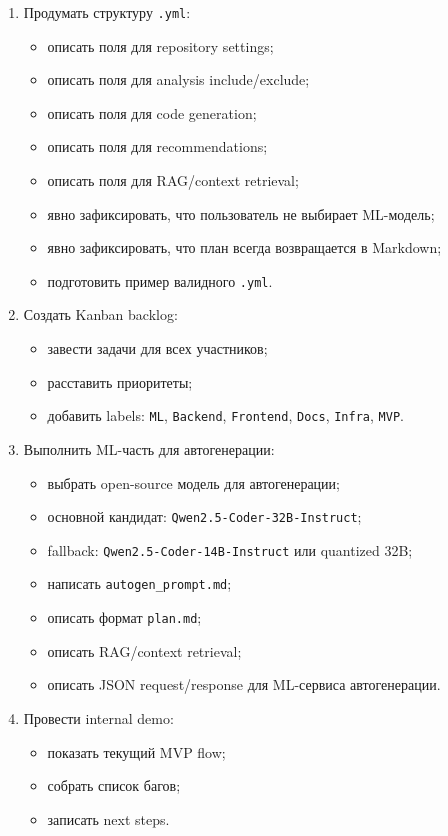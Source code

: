 \documentclass[12pt,a4paper]{article}
\begin{document}
\begin{enumerate}
    \item Продумать структуру \texttt{.yml}:
    \begin{itemize}
        \item описать поля для repository settings;
        \item описать поля для analysis include/exclude;
        \item описать поля для code generation;
        \item описать поля для recommendations;
        \item описать поля для RAG/context retrieval;
        \item явно зафиксировать, что пользователь не выбирает ML-модель;
        \item явно зафиксировать, что план всегда возвращается в Markdown;
        \item подготовить пример валидного \texttt{.yml}.
    \end{itemize}

    \item Создать Kanban backlog:
    \begin{itemize}
        \item завести задачи для всех участников;
        \item расставить приоритеты;
        \item добавить labels: \texttt{ML}, \texttt{Backend}, \texttt{Frontend}, \texttt{Docs}, \texttt{Infra}, \texttt{MVP}.
    \end{itemize}

    \item Выполнить ML-часть для автогенерации:
    \begin{itemize}
        \item выбрать open-source модель для автогенерации;
        \item основной кандидат: \texttt{Qwen2.5-Coder-32B-Instruct};
        \item fallback: \texttt{Qwen2.5-Coder-14B-Instruct} или quantized 32B;
        \item написать \texttt{autogen\_prompt.md};
        \item описать формат \texttt{plan.md};
        \item описать RAG/context retrieval;
        \item описать JSON request/response для ML-сервиса автогенерации.
    \end{itemize}

    \item Провести internal demo:
    \begin{itemize}
        \item показать текущий MVP flow;
        \item собрать список багов;
        \item записать next steps.
    \end{itemize}
\end{enumerate}
\end{document}
